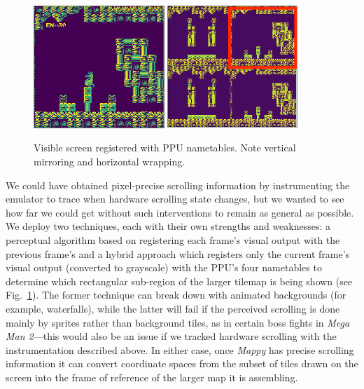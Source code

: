 \documentclass[12pt]{report}
\begin{document}
\begin{figure}
  \includegraphics[width=0.44\textwidth]{figures/screen.png}
  \includegraphics[width=0.44\textwidth]{figures/ntram.png}
  \caption{Visible screen registered with PPU nametables.  Note vertical mirroring and horizontal wrapping.} \label{fig:ntas}
\end{figure}

We could have obtained pixel-precise scrolling information by instrumenting the emulator to trace when hardware scrolling state changes, but we wanted to see how far we could get without such interventions to remain as general as possible.
We deploy two techniques, each with their own strengths and weaknesses: a perceptual algorithm based on registering each frame's visual output with the previous frame's and a hybrid approach which registers only the current frame's visual output (converted to grayscale) with the PPU's four nametables to determine which rectangular sub-region of the larger tilemap is being shown (see Fig.~\ref{fig:ntas}).
The former technique can break down with animated backgrounds (for example, waterfalls), while the latter will fail if the perceived scrolling is done mainly by sprites rather than background tiles, as in certain boss fights in \emph{Mega Man 2}---this would also be an issue if we tracked hardware scrolling with the instrumentation described above.
In either case, once \emph{Mappy} has precise scrolling information it can convert coordinate spaces from the subset of tiles drawn on the screen into the frame of reference of the larger map it is assembling.
\end{document}
